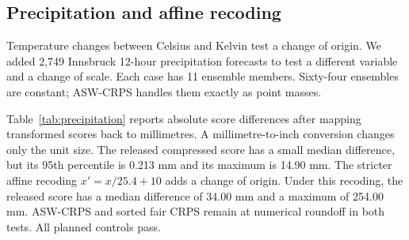 \documentclass[11pt]{article}
\begin{document}
\subsection{Precipitation and affine recoding}

Temperature changes between Celsius and Kelvin test a change of origin. We added 2,749 Innsbruck 12-hour precipitation forecasts to test a different variable and a change of scale. Each case has 11 ensemble members. Sixty-four ensembles are constant; ASW-CRPS handles them exactly as point masses.

Table~\ref{tab:precipitation} reports absolute score differences after mapping transformed scores back to millimetres. A millimetre-to-inch conversion changes only the unit size. The released compressed score has a small median difference, but its 95th percentile is 0.213 mm and its maximum is 14.90 mm. The stricter affine recoding $x'=x/25.4+10$ adds a change of origin. Under this recoding, the released score has a median difference of 34.00 mm and a maximum of 254.00 mm. ASW-CRPS and sorted fair CRPS remain at numerical roundoff in both tests. All planned controls pass.

\begin{table}[htbp]
\centering
\caption{Absolute score changes on 2,749 precipitation forecasts after transformed scores are returned to millimetres. The planned tolerance is $2\times10^{-4}$ mm.}
\label{tab:precipitation}
\small
{}
\end{table}
\end{document}
